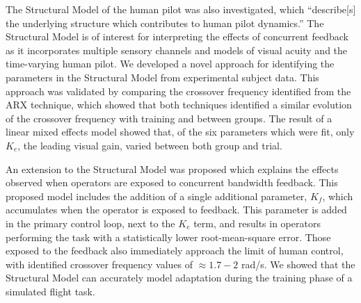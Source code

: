 The Structural Model of the human pilot was also investigated, which ``describe[s] the underlying structure which contributes to human pilot dynamics.''
The Structural Model is of interest for interpreting the effects of concurrent feedback as it incorporates multiple sensory channels and models of visual acuity and the time-varying human pilot.
We developed a novel approach for identifying the parameters in the Structural Model from experimental subject data.
This approach was validated by comparing the crossover frequency identified from the ARX technique, which showed that both techniques identified a similar evolution of the crossover frequency with training and between groups.
The result of a linear mixed effects model showed that, of the six parameters which were fit, only $K_e$, the leading visual gain, varied between both group and trial.

An extension to the Structural Model was proposed which explains the effects observed when operators are exposed to concurrent bandwidth feedback.
This proposed model includes the addition of a single additional parameter, $K_f$, which accumulates when the operator is exposed to feedback.
This parameter is added in the primary control loop, next to the $K_e$ term, and results in operators performing the task with a statistically lower root-mean-square error.
Those exposed to the feedback also immediately approach the limit of human control, with identified crossover frequency values of $\approx 1.7-2$ rad/s.
We showed that the Structural Model can accurately model adaptation during the training phase of a simulated flight task.
